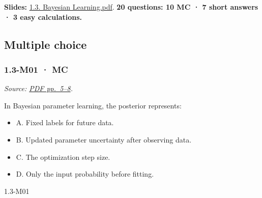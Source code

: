 \textbf{Slides:}
\href{../Lecture\%20Slides/1.3.\%20Bayesian\%20Learning.pdf}{1.3.
Bayesian Learning.pdf}. \textbf{20 questions: 10 MC · 7 short answers ·
3 easy calculations.}

\subsection{Multiple choice}\label{multiple-choice-2}

\noindent\begin{minipage}{\linewidth}

\subsubsection{1.3-M01 · MC}\label{m01-mc-2}

\emph{Source:
\href{../Lecture\%20Slides/1.3.\%20Bayesian\%20Learning.pdf\#page=5}{PDF
pp.~5--8}.}

In Bayesian parameter learning, the posterior represents:

\begin{itemize}
\tightlist
\item
  A. Fixed labels for future data.
\item
  B. Updated parameter uncertainty after observing data.
\item
  C. The optimization step size.
\item
  D. Only the input probability before fitting.
\end{itemize}

\begin{solution}[8mm]{1.3-M01}

\end{solution}
\end{minipage}\par\medskip

